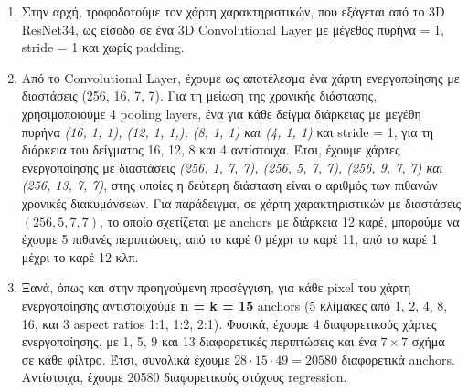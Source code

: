 \documentclass{report}
\begin{document}
\begin{enumerate}
\item Στην αρχή, τροφοδοτούμε τον χάρτη χαρακτηριστικών, που εξάγεται από το 3D ResNet34, ως είσοδο σε ένα 3D Convolutional Layer με μέγεθος πυρήνα = 1, stride = 1 και χωρίς padding.
\item Από το Convolutional Layer, έχουμε ως αποτέλεσμα ένα χάρτη ενεργοποίησης με διαστάσεις (256, 16, 7, 7). Για τη μείωση της χρονικής διάστασης, χρησιμοποιούμε 4 pooling layers,
  ένα για κάθε δείγμα διάρκειας με μεγέθη πυρήνα  \textit{(16, 1, 1), (12, 1, 1,), (8, 1, 1) και (4, 1, 1)} και stride = 1, για τη διάρκεια του δείγματος 16, 12, 8 και 4 αντίστοιχα.
  Έτσι, έχουμε χάρτες ενεργοποίησης με διαστάσεις \textit{(256, 1, 7, 7), (256, 5, 7, 7), (256, 9, 7, 7) και (256, 13, 7, 7)}, στης oποίες η δεύτερη διάσταση είναι ο αριθμός των πιθανών
  χρονικές διακυμάνσεων. Για παράδειγμα, σε  χάρτη χαρακτηριστικών με διαστάσεις $(256, 5, 7, 7)$, το οποίο σχετίζεται με anchors με διάρκεια 12 καρέ, μπορούμε να έχουμε 5 πιθανές περιπτώσεις,
  από το καρέ 0 μέχρι το καρέ 11, από το καρέ 1 μέχρι το καρέ 12 κλπ.
  
\item Ξανά, όπως και στην προηγούμενη προσέγγιση, για κάθε pixel του χάρτη ενεργοποίησης αντιστοιχούμε \textbf{n = k = 15}
  anchors (5 κλίμακες από 1, 2, 4, 8, 16, και 3 aspect ratios 1:1, 1:2, 2:1). Φυσικά, έχουμε 4 διαφορετικούς χάρτες ενεργοποίησης, με 1, 5, 9 και 13
  διαφορετικές περιπτώσεις και ένα $7  \times 7$ σχήμα σε κάθε φίλτρο. Έτσι, συνολικά έχουμε $28  \cdot 15 \cdot 49 = 20580$ διαφορετικά anchors.
  Αντίστοιχα, έχουμε 20580 διαφορετικούς στόχους regression.

\end{enumerate}

\end{document}
